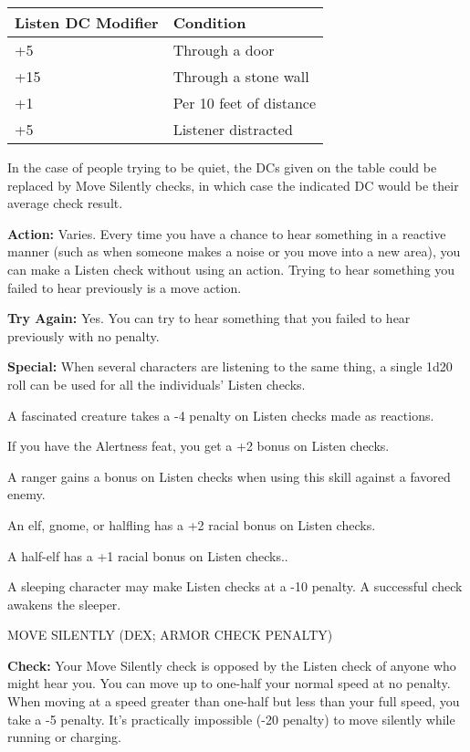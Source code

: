 \documentclass{article}
\begin{document}
\vspace{12pt}
\begin{tabular}{|>{\raggedright}p{56pt}|>{\raggedright}p{92pt}|}
\hline
L\textbf{isten DC Modifier} & C\textbf{ondition}\tabularnewline
\hline
+5 & Through a door\tabularnewline
\hline
+15 & Through a stone wall\tabularnewline
\hline
+1 & Per 10 feet of distance\tabularnewline
\hline
+5 & Listener distracted\tabularnewline
\hline
\end{tabular}

\vspace{12pt}
In the case of people trying to be quiet, the DCs given on the table could be replaced 
by Move Silently checks, in which case the indicated DC would be their average 
check result. 

\textbf{Action:} Varies. Every time you have a chance to hear something in a reactive 
manner (such as when someone makes a noise or you move into a new area), you can 
make a Listen check without using an action. Trying to hear something you failed 
to hear previously is a move action.

\textbf{Try Again:} Yes. You can try to hear something that you failed to hear 
previously with no penalty.

\textbf{Special:} When several characters are listening to the same thing, a single 
1d20 roll can be used for all the individuals' Listen checks.

A fascinated creature takes a -4 penalty on Listen checks made as reactions.

If you have the Alertness feat, you get a +2 bonus on Listen checks.

A ranger gains a bonus on Listen checks when using this skill against a favored 
enemy.

An elf, gnome, or halfling has a +2 racial bonus on Listen checks. 

A half-elf has a +1 racial bonus on Listen checks..

A sleeping character may make Listen checks at a -10 penalty. A successful check 
awakens the sleeper.

\vspace{12pt}
MOVE SILENTLY (DEX; ARMOR CHECK PENALTY)

\textbf{Check:} Your Move Silently check is opposed by the Listen check of anyone 
who might hear you. You can move up to one-half your normal speed at no penalty. 
When moving at a speed greater than one-half but less than your full speed, you 
take a -5 penalty. It's practically impossible (-20 penalty) to move silently while 
running or charging.
\end{document}
